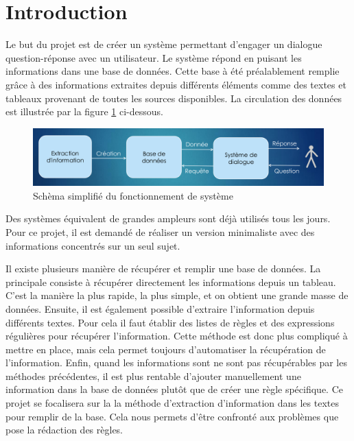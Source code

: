 \documentclass[11pt,a4paper]{article}
\begin{document}



\tableofcontents

\clearpage

\section{Introduction}

Le but du projet est de créer un système permettant d'engager un dialogue question-réponse avec un utilisateur.
Le système répond en puisant les informations dans une base de données.
Cette base à été préalablement remplie grâce à des informations extraites depuis différents éléments comme des textes et tableaux provenant de toutes les sources disponibles.
La circulation des données est illustrée par la figure \ref{fig:schema} ci-dessous.

\begin{figure}[!htb]
	\includegraphics[width=\textwidth]{schemaSysteme.png}
	\caption{Schèma simplifié du fonctionnement de système}
	\label{fig:schema}
\end{figure}

Des systèmes équivalent de grandes ampleurs sont déjà utilisés tous les jours.
Pour ce projet, il est demandé de réaliser un version minimaliste avec des informations concentrés sur un seul sujet.

Il existe plusieurs manière de récupérer et remplir une base de données.
La principale consiste à récupérer directement les informations depuis un tableau.
C'est la manière la plus rapide, la plus simple, et on obtient une grande masse de données.
Ensuite, il est également possible d'extraire l'information depuis différents textes.
Pour cela il faut établir des listes de règles et des expressions régulières pour récupérer l'information.
Cette méthode est donc plus compliqué à mettre en place, mais cela permet toujours d'automatiser la récupération de l'information.
Enfin, quand les informations sont ne sont pas récupérables par les méthodes précédentes, il est plus rentable d'ajouter manuellement une information dans la base de données plutôt que de créer une règle spécifique.
Ce projet se focalisera sur la la méthode d'extraction d'information dans les textes pour remplir de la base.
Cela nous permets d'être confronté aux problèmes que pose la rédaction des règles.
\end{document}
